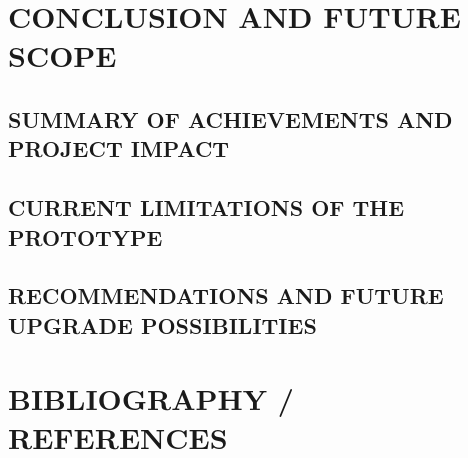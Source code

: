 \documentclass[a4paper,12pt,oneside]{report}
\begin{document}
\chapter{CONCLUSION AND FUTURE SCOPE}

\section{SUMMARY OF ACHIEVEMENTS AND PROJECT IMPACT}

\section{CURRENT LIMITATIONS OF THE PROTOTYPE}

\section{RECOMMENDATIONS AND FUTURE UPGRADE POSSIBILITIES}

\newpage
\chapter{BIBLIOGRAPHY / REFERENCES}
\end{document}

